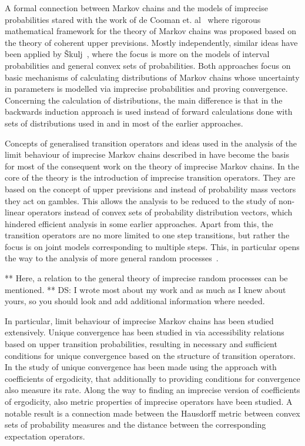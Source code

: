 \documentclass[11pt,dvipsnames,usenames,a4paper]{article}
\begin{document}
A formal connection between Markov chains and the models of imprecise probabilities stared with the work of de Cooman et. al~\cite{cooman2008} where rigorous mathematical framework for the theory of Markov chains was proposed based on the theory of coherent upper previsions. Mostly independently, similar ideas have been applied by Škulj~\cite{skulj:09}, where the focus is more on the models of interval probabilities and general convex sets of probabilities. Both approaches focus on basic mechanisms of calculating distributions of Markov chains whose uncertainty in parameters is modelled via imprecise probabilities and proving convergence. Concerning the calculation of distributions, the main difference is that in \cite{cooman2008} the backwards induction approach is used instead of forward calculations done with sets of distributions used in \cite{skulj:09} and in most of the earlier approaches. 


Concepts of generalised transition operators and ideas used in the analysis of the limit behaviour of imprecise Markov chains described in \cite{cooman2008} have become the basis for most of the consequent work on the theory of imprecise Markov chains. In the core of the theory is the introduction of imprecise transition operators. They are based on the concept of upper previsions and instead of probability mass vectors they act on gambles. This allows the analysis to be reduced to the study of non-linear operators instead of convex sets of probability distribution vectors, which hindered efficient analysis in some earlier approaches. Apart from this, the transition operators are no more limited to one step transitions, but rather the focus is on joint models corresponding to multiple steps. This, in particular opens the way to the analysis of more general random processes~\cite{cooman2015:markovergodic}.

** Here, a relation to the general theory of imprecise random processes can be mentioned. 
** DS: I wrote most about my work and as much as I knew about yours, so you should look and add additional information where needed. 

In particular, limit behaviour of imprecise Markov chains has been studied extensively. Unique convergence has been studied in \cite{cooman2008,hermans2012} via accessibility relations based on upper transition probabilities, resulting in necessary and sufficient conditions for unique convergence based on the structure of transition operators.
In \cite{skulj2013} the study of unique convergence has been made using the approach with coefficients of ergodicity, that additionally to providing conditions for convergence also measure its rate. Along the way to finding an imprecise version of coefficients of ergodicity, also metric properties of imprecise operators have been studied. A notable result is a connection made between the Hausdorff metric between convex sets of probability measures and the distance between the corresponding expectation operators. 
\end{document}
